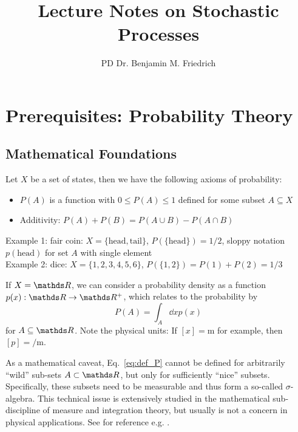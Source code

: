 \documentclass{notebook}
\title{\color{bluebase} Lecture Notes on Stochastic Processes}
\author{PD Dr. Benjamin M. Friedrich}
\begin{document}
	
\frontmatter

\maketitle

\tableofcontents

\mainmatter

\chapter{Prerequisites: Probability Theory}

\section{Mathematical Foundations}

\begin{theorem}
	Let $X$ be a set of states, then we have the following axioms of probability:
	\begin{itemize}
		\item{$P(A)$ is a function with $0 \leq P(A) \leq 1$ defined for some subset $A \subseteq X$}
		\item{Additivity: $P(A) + P(B) = P(A \cup B) - P(A \cap B)$}
	\end{itemize}
\end{theorem}

Example 1: fair coin: $X=\{\text{head},\text{tail}\}$, $P(\{\text{head}\})=1/2$, 
sloppy notation $p(\text{head})$ for set $A$ with single element \\
Example 2: dice: $X=\{1,2,3,4,5,6\}$, $P(\{1,2\})=P(1)+P(2)=1/3$

If $X = \R$, we can consider a probability density as a function $p(x) : \R \to \R^+$, which relates to the probability by
%
\begin{equation}
\label{eq:def_P}
P(A) = \int_A{\dd{x} p(x)}
\end{equation}
%
for $A \subseteq \R$. Note the physical units: If $[x] = \si{\meter}$ for example, then $[p] = \si{\per \meter}$. 

As a mathematical caveat, Eq.~\eqref{eq:def_P} cannot be defined for arbitrarily ``wild'' sub-sets $A \subset \R$, but only for sufficiently ``nice'' subsets. Specifically, these subsets need to be measurable and thus form a so-called $\sigma$-algebra. This technical issue is extensively studied in the mathematical sub-discipline of measure and integration theory, but usually is not a concern in physical applications. See for reference e.g. \cite{Billingsley2012}.
\end{document}
